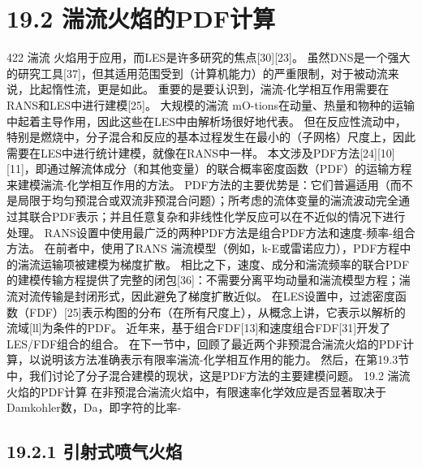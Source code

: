 \documentclass[UTF8,11pt,a4paper,openany,fontset=fandol]{ctexbook}
\begin{document}
\section{19.2 湍流火焰的PDF计算}
422 湍流 火焰用于应用，而LES是许多研究的焦点[30][23]。 虽然DNS是一个强大的研究工具[37]，但其适用范围受到（计算机能力）的严重限制，对于被动流来说，比起惰性流，更是如此。 重要的是要认识到，湍流-化学相互作用需要在RANS和LES中进行建模[25]。 大规模的湍流 mO-tions在动量、热量和物种的运输中起着主导作用，因此这些在LES中由解析场很好地代表。 但在反应性流动中，特别是燃烧中，分子混合和反应的基本过程发生在最小的（子网格）尺度上，因此需要在LES中进行统计建模，就像在RANS中一样。 本文涉及PDF方法[24][10][11]，即通过解流体成分（和其他变量）的联合概率密度函数（PDF）的运输方程来建模湍流-化学相互作用的方法。 PDF方法的主要优势是：它们普遍适用（而不是局限于均匀预混合或双流非预混合问题）；所考虑的流体变量的湍流波动完全通过其联合PDF表示；并且任意复杂和非线性化学反应可以在不近似的情况下进行处理。 RANS设置中使用最广泛的两种PDF方法是组合PDF方法和速度-频率-组合方法。 在前者中，使用了RANS 湍流模型（例如，k-E或雷诺应力），PDF方程中的湍流运输项被建模为梯度扩散。 相比之下，速度、成分和湍流频率的联合PDF的建模传输方程提供了完整的闭包[36]：不需要分离平均动量和湍流模型方程；湍流对流传输是封闭形式，因此避免了梯度扩散近似。 在LES设置中，过滤密度函数（FDF）[25]表示构图的分布（在所有尺度上），从概念上讲，它表示以解析的流域[ll]为条件的PDF。 近年来，基于组合FDF[13]和速度组合FDF[31]开发了LES/FDF组合的组合。 在下一节中，回顾了最近两个非预混合湍流火焰的PDF计算，以说明该方法准确表示有限率湍流-化学相互作用的能力。 然后，在第19.3节中，我们讨论了分子混合建模的现状，这是PDF方法的主要建模问题。 19.2 湍流火焰的PDF计算 在非预混合湍流火焰中，有限速率化学效应是否显著取决于Damkohler数，Da，即字符的比率-

\subsection{19.2.1 引射式喷气火焰}
\end{document}
